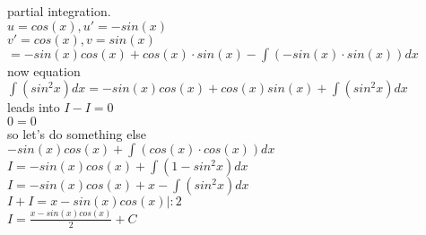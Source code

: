 \documentclass{article}
\begin{document}
  partial integration.\\
  $u=cos(x), u'=-sin(x)$\\
  $v'=cos(x), v=sin(x)$\\
  $=-sin(x)cos(x)+cos(x)\cdot sin(x)-\int(-sin(x)\cdot sin(x))dx$\\
  now equation\\
  $\int (sin^2x)dx=-sin(x)cos(x)+cos(x)sin(x)+\int(sin^2x)dx$\\
  leads into $I - I = 0$\\
  $0=0$\\
  so let's do something else\\
  $-sin(x)cos(x)+\int(cos(x)\cdot cos(x))dx$\\
  $I=-sin(x)cos(x)+\int(1-sin^2x)dx$\\
  $I=-sin(x)cos(x)+x-\int(sin^2x)dx$\\
  $I+I=x-sin(x)cos(x) |:2$\\
  $I=\frac{x-sin(x)cos(x)}{2}+C$\\
   
\end{document}
